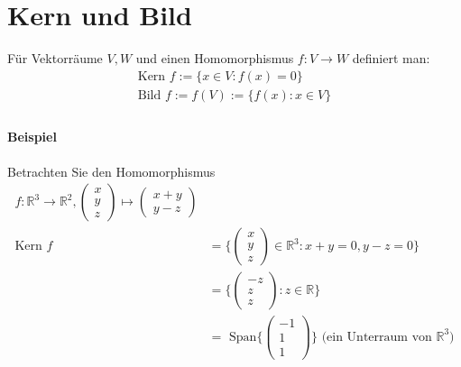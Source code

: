 \documentclass[11pt]{report}
\newcommand*\Zb[1] {\mathbb{#1}}
\begin{document}
\section{Kern und Bild}
Für Vektorräume $V, W$ und einen Homomorphismus $f: V \rightarrow W$ definiert man:
\begin{align}
 \text{Kern } f := \{x \in V: f(x) = 0\} \\
 \text{Bild } f := f(V) := \{f(x): x\in V\} \\
\end{align}
\paragraph{Beispiel}
Betrachten Sie den Homomorphismus
\begin{align}
 f: \Zb{R}^3 \rightarrow \Zb{R}^2, \begin{pmatrix} x \\ y \\ z \end{pmatrix} \mapsto \begin{pmatrix} x + y \\ y - z \end{pmatrix}\\
\text{Kern }f &= \{\begin{pmatrix} x \\ y \\ z \end{pmatrix} \in \Zb{R}^3: x+y=0, y-z=0\} \\
 &= \{\begin{pmatrix} -z \\ z \\ z \end{pmatrix} : z \in \Zb{R}\} \\
 &= \text{ Span} \{\begin{pmatrix} -1\\1\\1\end{pmatrix}\}  \text{ (ein Unterraum von $\Zb{R}^3$)}
\end{align}
\end{document}
